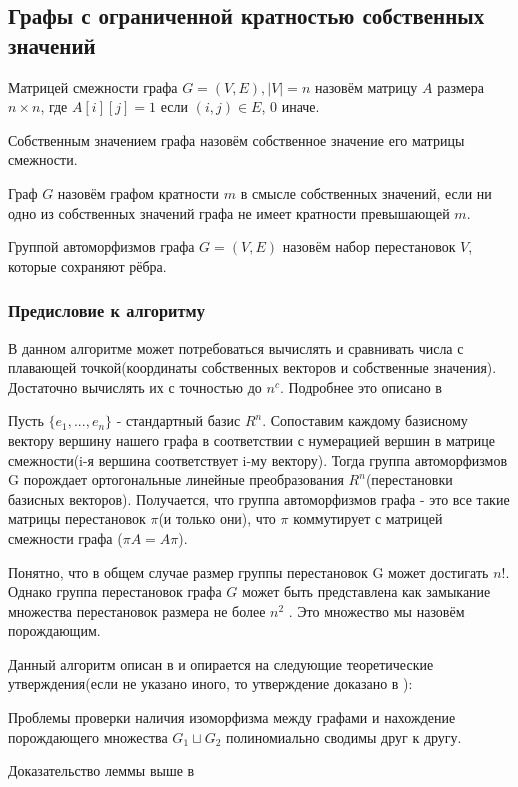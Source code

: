 \subsection{Графы с ограниченной кратностью собственных значений}

\begin{definition}
    Матрицей смежности графа $G=(V, E), |V|=n$ назовём матрицу $A$ размера $n \times n$, где $A[i][j] = 1$ если $(i, j) \in E$, 0 иначе.
\end{definition}
\begin{definition}
    Собственным значением графа назовём собственное значение его матрицы смежности.
\end{definition}
\begin{definition}
    Граф $G$ назовём графом кратности $m$ в смысле собственных значений, если ни одно из собственных значений графа не имеет кратности превышающей $m$.
\end{definition}
\begin{definition}
    Группой автоморфизмов графа $G=(V, E)$ назовём набор перестановок $V$, которые сохраняют рёбра.
\end{definition}

\subsubsection*{Предисловие к алгоритму}
    В данном алгоритме может потребоваться вычислять и сравнивать числа с плавающей точкой(координаты собственных векторов и собственные значения). Достаточно вычислять их с точностью до $n^c$. Подробнее это описано в \cite{10}

    Пусть $\{e_1, ..., e_n\}$ - стандартный базис $R^n$. Сопоставим каждому базисному вектору вершину нашего графа в соответствии с нумерацией вершин в матрице смежности(i-я вершина соответствует i-му вектору). Тогда группа автоморфизмов G порождает ортогональные линейные преобразования $R^n$(перестановки базисных векторов). Получается, что группа автоморфизмов графа - это все такие матрицы перестановок $\pi$(и только они), что $\pi$ коммутирует с матрицей смежности графа ($\pi A = A \pi$).
    
    Понятно, что в общем случае размер группы перестановок G может достигать $n!$. Однако группа перестановок графа $G$ может быть представлена как замыкание множества перестановок размера не более $n^2$ \cite{9}. Это множество мы назовём порождающим.

Данный алгоритм описан в \cite{8} и опирается на следующие теоретические утверждения(если не указано иного, то утверждение доказано в \cite{8}):
\begin{lemma}
    Проблемы проверки наличия изоморфизма между графами и нахождение порождающего множества $G_1 \sqcup G_2$ полиномиально сводимы друг к другу.
\end{lemma}
Доказательство леммы выше в \cite{7}


